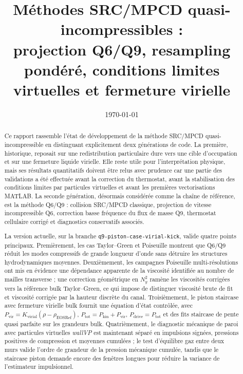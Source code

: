 \documentclass[11pt,a4paper]{article}
\title{Méthodes SRC/MPCD quasi-incompressibles :\\ projection Q6/Q9, resampling pondéré, conditions limites virtuelles et fermeture virielle}
\author{}
\date{\today}
\begin{document}
\maketitle



\begin{abstract}
Ce rapport rassemble l'état de développement de la méthode SRC/MPCD quasi-incompressible en distinguant explicitement deux générations de code. La première, historique, reposait sur une redistribution particulaire dure vers une cible d'occupation et sur une fermeture liquide virielle. Elle reste utile pour l'interprétation physique, mais ses résultats quantitatifs doivent être relus avec prudence car une partie des validations a été effectuée avant la correction du thermostat, avant la stabilisation des conditions limites par particules virtuelles et avant les premières vectorisations MATLAB. La seconde génération, désormais considérée comme la chaîne de référence, est la méthode Q6/Q9 : collision SRC/MPCD classique, projection de vitesse incompressible Q6, correction basse fréquence du flux de masse Q9, thermostat cellulaire corrigé et diagnostics conservatifs associés.

La version actuelle, sur la branche \texttt{q9-piston-case-virial-kick}, valide quatre points principaux. Premièrement, les cas Taylor--Green et Poiseuille montrent que Q6/Q9 réduit les modes compressifs de grande longueur d'onde sans détruire les structures hydrodynamiques moyennes. Deuxièmement, les campagnes Poiseuille multi-résolutions ont mis en évidence une dépendance apparente de la viscosité identifiée au nombre de mailles transverse ; une correction géométrique en \(N_y^2\) ramène les viscosités corrigées vers la référence bulk Taylor--Green, ce qui impose de distinguer viscosité brute de fit et viscosité corrigée par la hauteur discrète du canal. Troisièmement, le piston staircase avec fermeture virielle bulk fournit une équation d'état contrôlée, avec \(P_{\mathrm{vir}}=K_{\mathrm{virial}}(\rho-\rho_{\mathrm{EOSRef}})\), \(P_{\mathrm{tot}}=P_{\mathrm{kin}}+P_{\mathrm{vir}}\), \(P_{\mathrm{drive}}=P_{\mathrm{tot}}\) et des fits staircase de pente quasi parfaite sur les grandeurs bulk. Quatrièmement, le diagnostic mécanique de paroi avec particules virtuelles \emph{wallVP} est maintenant séparé en impulsions signées, pressions positives de compression et moyennes cumulées ; le test d'équilibre gaz entre deux murs valide l'ordre de grandeur de la pression mécanique cumulée, tandis que le staircase piston demande encore des fenêtres longues pour réduire la variance de l'estimateur impulsionnel.




\end{abstract}
\end{document}
